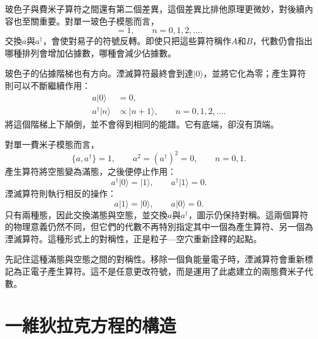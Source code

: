 玻色子與費米子算符之間還有第二個差異，這個差異比排他原理更微妙，對後續內容也至關重要。對單一玻色子模態而言，
\begin{equation}
[a,a^\dagger]=1,
\qquad
n=0,1,2,\ldots.
\end{equation}
交換\(a\)與\(a^\dagger\)，會使對易子的符號反轉。即使只把這些算符稱作\(A\)和\(B\)，代數仍會指出哪種排列會增加佔據數，哪種會減少佔據數。

玻色子的佔據階梯也有方向。湮滅算符最終會到達\(\lvert0\rangle\)，並將它化為零；產生算符則可以不斷繼續作用：
\begin{align}
a\lvert0\rangle&=0,\\
a^\dagger\lvert n\rangle&\propto\lvert n+1\rangle,
\qquad n=0,1,2,\ldots.
\end{align}
將這個階梯上下顛倒，並不會得到相同的能譜。它有底端，卻沒有頂端。

對單一費米子模態而言，
\begin{equation}
\{a,a^\dagger\}=1,
\qquad
a^2=(a^\dagger)^2=0,
\qquad
n=0,1.
\label{eq:l10-fermion-mode}
\end{equation}
產生算符將空態變為滿態，之後便停止作用：
\begin{equation}
a^\dagger\lvert0\rangle=\lvert1\rangle,
\qquad
a^\dagger\lvert1\rangle=0.
\end{equation}
湮滅算符則執行相反的操作：
\begin{equation}
a\lvert1\rangle=\lvert0\rangle,
\qquad
a\lvert0\rangle=0.
\end{equation}
只有兩種態，因此交換滿態與空態，並交換\(a\)與\(a^\dagger\)，圖示仍保持對稱。這兩個算符的物理意義仍然不同，但它們的代數不再特別指定其中一個為產生算符、另一個為湮滅算符。這種形式上的對稱性，正是粒子—空穴重新詮釋的起點。

\begin{classroomqa}
\end{classroomqa}

先記住這種滿態與空態之間的對稱性。移除一個負能量電子時，湮滅算符會重新標記為正電子產生算符。這不是任意更改符號，而是運用了此處建立的兩態費米子代數。

\section{一維狄拉克方程的構造}

